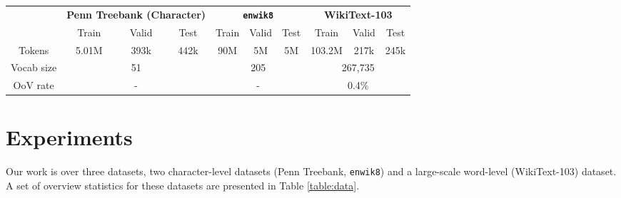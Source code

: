 \documentclass{article}
\newcommand{\enwik}{\texttt{enwik8}\xspace}
\begin{document}
\begin{table*}
\begin{center}
\begin{tabular}[t]{c|ccc|ccc|ccc}
\toprule
& \multicolumn{3}{c|}{{\bf Penn Treebank (Character)}} & \multicolumn{3}{c|}{{\bf \enwik}} & \multicolumn{3}{c}{{\bf WikiText-103}} \\
& Train & Valid & Test & Train & Valid & Test & Train & Valid & Test \\
\midrule
Tokens & 5.01M & 393k & 442k & 90M & 5M & 5M & 103.2M & 217k & 245k \\
\midrule
Vocab size & \multicolumn{3}{c|}{51} & \multicolumn{3}{c|}{205} & \multicolumn{3}{c}{267,735} \\
OoV rate & \multicolumn{3}{c|}{-} & \multicolumn{3}{c|}{-} & \multicolumn{3}{c}{0.4\%} \\
\bottomrule
\end{tabular}
\caption{Statistics of the character-level Penn Treebank, character-level \enwik dataset, and WikiText-103. The out of vocabulary (OoV) rate notes what percentage of tokens have been replaced by an  token, not applicable to character-level datasets.}
\label{table:data}
\end{center}
\end{table*}

\section{Experiments}

Our work is over three datasets, two character-level datasets (Penn Treebank, \enwik) and a large-scale word-level (WikiText-103) dataset.
A set of overview statistics for these datasets are presented in Table \ref{table:data}.
\end{document}
